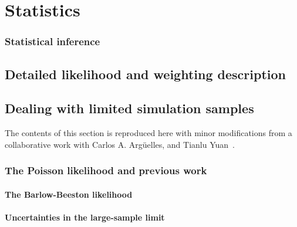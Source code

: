 \chapter{Statistics}\label{chapter:statistics}
\subsection{Statistical inference\label{sec:statistics}}
\begingroup
\graphicspath{{results/HESE_Final_Paper/}}

\endgroup

\section{Detailed likelihood and weighting description\label{sec:likelihood}}
\begingroup
\graphicspath{{results/HESE_Final_Paper/}}

\endgroup

\section{Dealing with limited simulation samples\label{sec:limited_simulation}}
The contents of this section is reproduced here with minor modifications from a collaborative work with Carlos A. Argüelles, and Tianlu Yuan~\cite{Arguelles:2019izp}.

\begingroup
\graphicspath{{results/mcllh_paper/}}

\endgroup

\subsection{The Poisson likelihood and previous work\label{sec:mc_intro}}
\begingroup
\graphicspath{{results/mcllh_paper/}}

\endgroup

\subsubsection{The Barlow-Beeston likelihood}
\begingroup
\graphicspath{{results/mcllh_paper/}}

\endgroup

\subsubsection{Uncertainties in the large-sample limit}
\begingroup
\graphicspath{{results/mcllh_paper/}}

\endgroup

